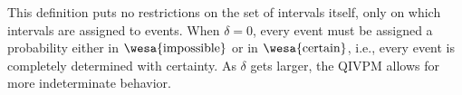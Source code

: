 \documentclass[english,reprint, aps, prl,superscriptaddress, showpacs,
showkeys, longbibliography, amsmath, amssymb, floatfix]{revtex4-1}
\theoremstyle{plain}
\theoremstyle{definition}
\newcommand{\imposs}{{\text{\wesa{impossible}}}}
\newcommand{\necess}{{\text{\wesa{certain}}}}
\newcommand{\unknown}{{\text{\wesa{unknown}}}}
\newcommand{\proj}[1]{\op{#1}{#1}}
\newcommand{\yutsung}[1]{\begin{framed}\begin{minipage}{0.9\linewidth}\color{purple}{Yu-Tsung says: #1}\end{minipage}\end{framed}}
\begin{document}

\noindent This definition puts no restrictions on the set of intervals
itself, only on which intervals are assigned to events. When
$\delta=0$, every event must be assigned a probability either in
$\imposs$ or in $\necess$, i.e., every event is completely determined
with certainty. As $\delta$ gets larger, the QIVPM allows for more
indeterminate behavior. %
\end{document}

